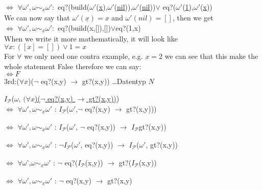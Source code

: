 \documentclass[10pt, a4paper]{article}
\newcommand{\letomega}{$\omega$}
\newcommand{\InterP}{$I_{\mathcal{P}}$}
\newcommand{\unl}[1]{\underline{#1}}
\begin{document}
$\iff$ $\forall \omega',\omega \sim_{\unl{x}} \omega' :$ eq?(build($\omega'$(\unl{x}),$\omega'$(\unl{nil})),$\omega'$(\unl{nil}))$\lor$ eq?($\omega'$(\unl{1}),$\omega'$(\unl{x})) \vspace{6pt} \\
We can now say that $\omega'(\unl{x}) = x$ and $\omega'(nil) = []$, then we get \vspace{6pt} \\
$\iff$ $\forall \omega',\omega \sim_{\unl{x}} \omega' :$ eq?(build(x,[]),[])$\lor$eq?(1,x) \vspace{6pt} \\
When we write it more mathematically, it will look like \vspace{6pt} \\
$\forall x : ([x] = []) \lor 1 = x$ \vspace{6pt} \\
For $\forall$ we only need one contra example, e.g. $x = 2$ we can see that this make the whole statement False therefore we can say: \vspace{6pt} \\
$\iff F$ \\


3rd:($\forall x$)($\neg$ eq?(x,y) $\rightarrow$ gt?(x,y)) \dots Datentyp $N$

\InterP(\letomega, \unl{$(\forall x$)($\neg$ eq?(x,y) $\rightarrow$ gt?(x,y))}) \vspace{2pt} \\

$\iff$ $\forall \omega',\omega \sim_{\unl{x}} \omega'$ : \InterP($\omega'$,$\neg$ eq?(x,y) $\rightarrow$ gt?(x,y)))

$\iff$ $\forall \omega',\omega \sim_{\unl{x}} \omega'$ : \InterP($\omega'$, $\neg$ eq?(x,y)) $\rightarrow$ \InterP gt?(x,y))

$\iff$ $\forall \omega',\omega \sim_{\unl{x}} \omega'$ : $\neg$\InterP($\omega'$,  eq?(x,y)) $\rightarrow$ \InterP($\omega'$, gt?(x,y))

$\iff$ $\forall \omega$',$\omega \sim_{\unl{x}} \omega'$ : $\neg$ eq?(\InterP(x,y)) $\rightarrow$  gt?(\InterP(x,y))

$\iff$ $\forall \omega',\omega \sim_{\unl{x}} \omega'$ : $\neg$ eq?(x,y) $\rightarrow$ gt?(x,y)
\end{document}
